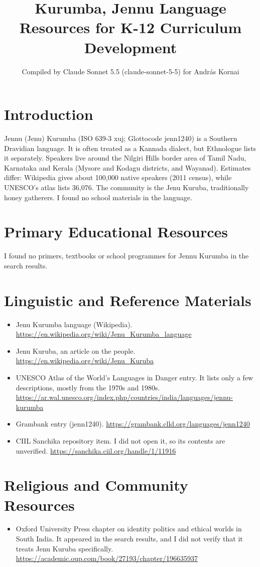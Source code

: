 \documentclass[12pt]{article}
\title{Kurumba, Jennu Language Resources for K-12 Curriculum Development}
\author{Compiled by Claude Sonnet 5.5 (claude-sonnet-5-5) for Andr\'as Kornai}
\date{}
\begin{document}
\maketitle

\section{Introduction}
Jennu (Jenu) Kurumba (ISO 639-3 xuj; Glottocode jenn1240) is a Southern Dravidian language. It is often treated as a Kannada dialect, but Ethnologue lists it separately. Speakers live around the Nilgiri Hills border area of Tamil Nadu, Karnataka and Kerala (Mysore and Kodagu districts, and Wayanad). Estimates differ: Wikipedia gives about 100,000 native speakers (2011 census), while UNESCO's atlas lists 36,076. The community is the Jenu Kuruba, traditionally honey gatherers. I found no school materials in the language.

\section{Primary Educational Resources}
I found no primers, textbooks or school programmes for Jennu Kurumba in the search results.

\section{Linguistic and Reference Materials}
\begin{itemize}
\item Jenu Kurumba language (Wikipedia). \url{https://en.wikipedia.org/wiki/Jenu_Kurumba_language}
\item Jenu Kuruba, an article on the people. \url{https://en.wikipedia.org/wiki/Jenu_Kuruba}
\item UNESCO Atlas of the World's Languages in Danger entry. It lists only a few descriptions, mostly from the 1970s and 1980s. \url{https://ar.wal.unesco.org/index.php/countries/india/languages/jennu-kurumba}
\item Grambank entry (jenn1240). \url{https://grambank.clld.org/languages/jenn1240}
\item CIIL Sanchika repository item. I did not open it, so its contents are unverified. \url{https://sanchika.ciil.org/handle/1/11916}
\end{itemize}

\section{Religious and Community Resources}
\begin{itemize}
\item Oxford University Press chapter on identity politics and ethical worlds in South India. It appeared in the search results, and I did not verify that it treats Jenu Kuruba specifically. \url{https://academic.oup.com/book/27193/chapter/196635937}
\end{itemize}
\end{document}

